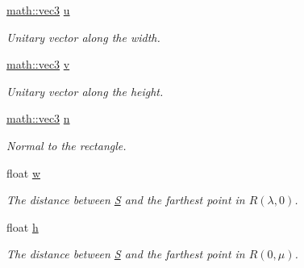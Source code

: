 \begin{DoxyCompactItemize}
\mbox{\label{classphysim_1_1init_1_1rect__source_ab46280374968757bd185cb9053020371}} 
\hyperlink{structphysim_1_1math_1_1vec3}{math\+::vec3} \hyperlink{classphysim_1_1init_1_1rect__source_ab46280374968757bd185cb9053020371}{u}
\begin{DoxyCompactList}\small\item\em Unitary vector along the width. \end{DoxyCompactList}\item 
\mbox{\label{classphysim_1_1init_1_1rect__source_a3373fe0fda8e01ba6680bde903b371b1}} 
\hyperlink{structphysim_1_1math_1_1vec3}{math\+::vec3} \hyperlink{classphysim_1_1init_1_1rect__source_a3373fe0fda8e01ba6680bde903b371b1}{v}
\begin{DoxyCompactList}\small\item\em Unitary vector along the height. \end{DoxyCompactList}\item 
\hyperlink{structphysim_1_1math_1_1vec3}{math\+::vec3} \hyperlink{classphysim_1_1init_1_1rect__source_af4540b1269f8a0bf26fe7cad23bdbdd2}{n}
\begin{DoxyCompactList}\small\item\em Normal to the rectangle. \end{DoxyCompactList}\item 
\mbox{\label{classphysim_1_1init_1_1rect__source_a4a7f1402b417e2217ab3724e6e55c18b}} 
float \hyperlink{classphysim_1_1init_1_1rect__source_a4a7f1402b417e2217ab3724e6e55c18b}{w}
\begin{DoxyCompactList}\small\item\em The distance between \hyperlink{classphysim_1_1init_1_1rect__source_ab12449975c6df03027ff17b424fb151b}{S} and the farthest point in $R(\lambda,0)$. \end{DoxyCompactList}\item 
\mbox{\label{classphysim_1_1init_1_1rect__source_a9ada91327596758bd9e1d5053db0ff73}} 
float \hyperlink{classphysim_1_1init_1_1rect__source_a9ada91327596758bd9e1d5053db0ff73}{h}
\begin{DoxyCompactList}\small\item\em The distance between \hyperlink{classphysim_1_1init_1_1rect__source_ab12449975c6df03027ff17b424fb151b}{S} and the farthest point in $R(0,\mu)$. \end{DoxyCompactList}\end{DoxyCompactItemize}


